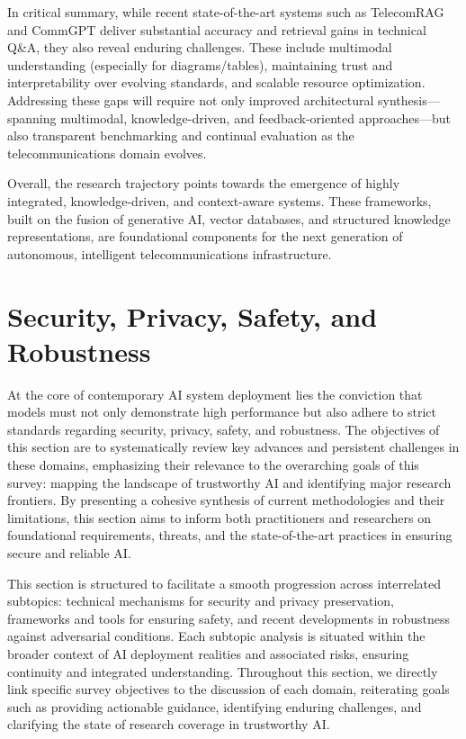 \documentclass[sigconf]{acmart}
\begin{document}
In critical summary, while recent state-of-the-art systems such as TelecomRAG and CommGPT deliver substantial accuracy and retrieval gains in technical Q\&A, they also reveal enduring challenges. These include multimodal understanding (especially for diagrams/tables), maintaining trust and interpretability over evolving standards, and scalable resource optimization. Addressing these gaps will require not only improved architectural synthesis---spanning multimodal, knowledge-driven, and feedback-oriented approaches---but also transparent benchmarking and continual evaluation as the telecommunications domain evolves.

Overall, the research trajectory points towards the emergence of highly integrated, knowledge-driven, and context-aware systems. These frameworks, built on the fusion of generative AI, vector databases, and structured knowledge representations, are foundational components for the next generation of autonomous, intelligent telecommunications infrastructure.

\section{Security, Privacy, Safety, and Robustness}
At the core of contemporary AI system deployment lies the conviction that models must not only demonstrate high performance but also adhere to strict standards regarding security, privacy, safety, and robustness. The objectives of this section are to systematically review key advances and persistent challenges in these domains, emphasizing their relevance to the overarching goals of this survey: mapping the landscape of trustworthy AI and identifying major research frontiers. By presenting a cohesive synthesis of current methodologies and their limitations, this section aims to inform both practitioners and researchers on foundational requirements, threats, and the state-of-the-art practices in ensuring secure and reliable AI.

This section is structured to facilitate a smooth progression across interrelated subtopics: technical mechanisms for security and privacy preservation, frameworks and tools for ensuring safety, and recent developments in robustness against adversarial conditions. Each subtopic analysis is situated within the broader context of AI deployment realities and associated risks, ensuring continuity and integrated understanding. Throughout this section, we directly link specific survey objectives to the discussion of each domain, reiterating goals such as providing actionable guidance, identifying enduring challenges, and clarifying the state of research coverage in trustworthy AI.
\end{document}
